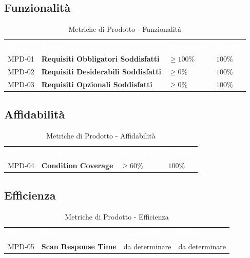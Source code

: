 \documentclass[a4paper, 11pt]{article}
\begin{document}
\subsection{Funzionalità}
\begin{table}[h!]
    \centering
    \begin{tabular}{>{\centering\arraybackslash}m{1.5cm} p{6cm} >{\centering\arraybackslash}m{3cm} >{\centering\arraybackslash}m{2.5cm}}
        \rowcolor{AccentColor}
        \textcolor{white}{\textbf{ID}} & \textcolor{white}{\textbf{Nome}} & \textcolor{white}{\textbf{Accettabile}} & \textcolor{white}{\textbf{Ottimo}} \\
        MPD-01 & \textbf{Requisiti Obbligatori Soddisfatti} & $\geq 100\%$ & $100\%$ \\
        MPD-02 & \textbf{Requisiti Desiderabili Soddisfatti} & $\geq 0\%$ & $100\%$ \\
        MPD-03 & \textbf{Requisiti Opzionali Soddisfatti} & $\geq 0\%$ & $100\%$ \\
    \end{tabular}
    \caption{Metriche di Prodotto - Funzionalità}
\end{table}

\subsection{Affidabilità}
\begin{table}[h!]
    \centering
    \begin{tabular}{>{\centering\arraybackslash}m{1.5cm} p{6cm} >{\centering\arraybackslash}m{3cm} >{\centering\arraybackslash}m{2.5cm}}
        \rowcolor{AccentColor}
        \textcolor{white}{\textbf{ID}} & \textcolor{white}{\textbf{Nome}} & \textcolor{white}{\textbf{Accettabile}} & \textcolor{white}{\textbf{Ottimo}} \\
        MPD-04 & \textbf{Condition Coverage } & $\geq 60\%$ & $100\%$ \\
    \end{tabular}
    \caption{Metriche di Prodotto - Affidabilità}
\end{table}

\newpage

\subsection{Efficienza}
\begin{table}[h!]
    \centering
    \begin{tabular}{>{\centering\arraybackslash}m{1.5cm} p{6cm} >{\centering\arraybackslash}m{3cm} >{\centering\arraybackslash}m{2.5cm}}
        \rowcolor{AccentColor}
        \textcolor{white}{\textbf{ID}} & \textcolor{white}{\textbf{Nome}} & \textcolor{white}{\textbf{Accettabile}} & \textcolor{white}{\textbf{Ottimo}} \\
        MPD-05 & \textbf{Scan Response Time} & da determinare & da determinare \\
    \end{tabular}
    \caption{Metriche di Prodotto - Efficienza}
\end{table}
\end{document}
